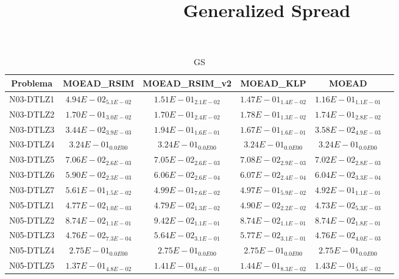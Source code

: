 \documentclass{article}
\title{Generalized Spread}
\author{}
\begin{document}
\maketitle
\begin{table*}[ht!]
\scriptsize
\caption{GS}
\centering\begin{tabular}{|c||c||c||c||c||c|} \hline
Problema &MOEAD_RSIM &MOEAD_RSIM_v2 &MOEAD_KLP &MOEAD\\\hline
N03-DTLZ1 &\cellcolor{gray95}$4.94E-02_{5.1E-02}$ &$1.51E-01_{2.1E-02}$ &$1.47E-01_{1.4E-02}$ &\cellcolor{gray25}$1.16E-01_{1.1E-01}$\\ 
\hline
N03-DTLZ2 &\cellcolor{gray95}$1.70E-01_{3.0E-02}$ &\cellcolor{gray25}$1.70E-01_{2.4E-02}$ &$1.78E-01_{1.3E-02}$ &$1.74E-01_{2.8E-02}$\\ 
\hline
N03-DTLZ3 &\cellcolor{gray95}$3.44E-02_{3.9E-03}$ &$1.94E-01_{1.6E-01}$ &$1.67E-01_{1.6E-01}$ &\cellcolor{gray25}$3.58E-02_{4.9E-03}$\\ 
\hline
N03-DTLZ4 &\cellcolor{gray95}$3.24E-01_{0.0E00}$ &\cellcolor{gray25}$3.24E-01_{0.0E00}$ &$3.24E-01_{0.0E00}$ &$3.24E-01_{0.0E00}$\\ 
\hline
N03-DTLZ5 &$7.06E-02_{2.6E-03}$ &\cellcolor{gray25}$7.05E-02_{2.6E-03}$ &$7.08E-02_{2.9E-03}$ &\cellcolor{gray95}$7.02E-02_{2.8E-03}$\\ 
\hline
N03-DTLZ6 &\cellcolor{gray95}$5.90E-02_{2.3E-03}$ &$6.06E-02_{2.6E-04}$ &$6.07E-02_{2.4E-04}$ &\cellcolor{gray25}$6.04E-02_{3.3E-04}$\\ 
\hline
N03-DTLZ7 &$5.61E-01_{1.5E-02}$ &$4.99E-01_{7.6E-02}$ &\cellcolor{gray25}$4.97E-01_{5.9E-02}$ &\cellcolor{gray95}$4.92E-01_{1.1E-01}$\\ 
\hline
N05-DTLZ1 &\cellcolor{gray25}$4.77E-02_{1.0E-03}$ &$4.79E-02_{1.3E-02}$ &$4.90E-02_{2.2E-02}$ &\cellcolor{gray95}$4.73E-02_{5.3E-03}$\\ 
\hline
N05-DTLZ2 &\cellcolor{gray25}$8.74E-02_{1.1E-01}$ &$9.42E-02_{1.1E-01}$ &\cellcolor{gray95}$8.74E-02_{1.1E-01}$ &$8.74E-02_{1.8E-01}$\\ 
\hline
N05-DTLZ3 &\cellcolor{gray25}$4.76E-02_{7.3E-04}$ &$5.64E-02_{3.1E-01}$ &$5.77E-02_{3.1E-01}$ &\cellcolor{gray95}$4.76E-02_{4.0E-03}$\\ 
\hline
N05-DTLZ4 &\cellcolor{gray95}$2.75E-01_{0.0E00}$ &\cellcolor{gray25}$2.75E-01_{0.0E00}$ &$2.75E-01_{0.0E00}$ &$2.75E-01_{0.0E00}$\\ 
\hline
N05-DTLZ5 &\cellcolor{gray95}$1.37E-01_{4.8E-02}$ &\cellcolor{gray25}$1.41E-01_{8.6E-01}$ &$1.44E-01_{8.3E-02}$ &$1.43E-01_{5.4E-02}$\\ 

\end{tabular}
\end{table*}
\end{document}
